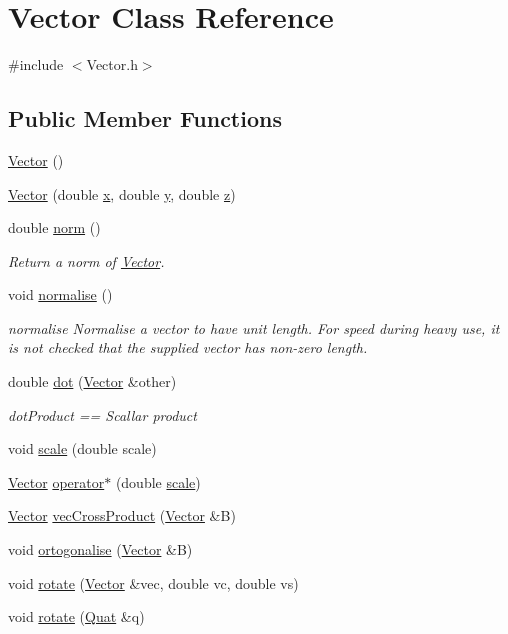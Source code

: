 \hypertarget{class_vector}{\section{Vector Class Reference}
\label{class_vector}
}


{\ttfamily \#include $<$Vector.\+h$>$}

\subsection*{Public Member Functions}
\begin{DoxyCompactItemize}
\item 
\hyperlink{class_vector_a6f80c73b5f18dcf3f8e36065bdc8b9e5}{Vector} ()
\item 
\hyperlink{class_vector_a70942524e217c2c27fc8e7d0925e6f72}{Vector} (double \hyperlink{class_vector_a133722e00601091cb2075219da5da6e4}{x}, double \hyperlink{class_vector_a09a21a140718f234eea348d5058cee0b}{y}, double \hyperlink{class_vector_a1b604d674485316754b72494f5fcc960}{z})
\item 
double \hyperlink{class_vector_a64d1af82e5f8d82c7a6ca5e309c3bf8f}{norm} ()
\begin{DoxyCompactList}\small\item\em Return a norm of \hyperlink{class_vector}{Vector}. \end{DoxyCompactList}\item 
void \hyperlink{class_vector_a761012be2c08d1cbaa8a44e0410fb974}{normalise} ()
\begin{DoxyCompactList}\small\item\em normalise Normalise a vector to have unit length. For speed during heavy use, it is not checked that the supplied vector has non-\/zero length. \end{DoxyCompactList}\item 
double \hyperlink{class_vector_aa2ff981d4257395089b9cd4d495ab515}{dot} (\hyperlink{class_vector}{Vector} \&other)
\begin{DoxyCompactList}\small\item\em dot\+Product == Scallar product \end{DoxyCompactList}\item 
void \hyperlink{class_vector_ae025201c6ecf1064414e3d0b750eaba2}{scale} (double scale)
\item 
\hyperlink{class_vector}{Vector} \hyperlink{class_vector_ab53264d0240b0dd982db08901358cad3}{operator$\ast$} (double \hyperlink{class_vector_ae025201c6ecf1064414e3d0b750eaba2}{scale})
\item 
\hyperlink{class_vector}{Vector} \hyperlink{class_vector_ad7e9ed5a363bd4a90677f2e4319fe47e}{vec\+Cross\+Product} (\hyperlink{class_vector}{Vector} \&B)
\item 
void \hyperlink{class_vector_a9f12df3a8c520453f6c56b88d5994404}{ortogonalise} (\hyperlink{class_vector}{Vector} \&B)
\item 
void \hyperlink{class_vector_ab37eae98dde960fd22125c325c22b39a}{rotate} (\hyperlink{class_vector}{Vector} \&vec, double vc, double vs)
\item 
void \hyperlink{class_vector_a8da9780f882eb766299c41fd5fb3fad4}{rotate} (\hyperlink{class_quat}{Quat} \&q)
\end{DoxyCompactItemize}
